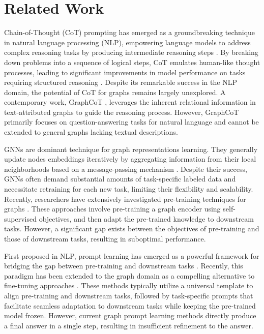\section{Related Work}
Chain-of-Thought (CoT) prompting has emerged as a groundbreaking technique in natural language processing (NLP), empowering language models to address complex reasoning tasks by producing intermediate reasoning steps \cite{wei2022chain,wang2023self,gao2023pal}. By breaking down problems into a sequence of logical steps, CoT emulates human-like thought processes, leading to significant improvements in model performance on tasks requiring structured reasoning \cite{yao2024tree,feng2024towards}. Despite its remarkable success in the NLP domain, the potential of CoT for graphs remains largely unexplored.  A contemporary work, GraphCoT \cite{jin2024graph}, leverages the inherent relational information in text-attributed graphs \cite{yan2023comprehensive,wen2023augmenting} to guide the reasoning process. However, GraphCoT primarily focuses on question-answering tasks for natural language and cannot be extended to general graphs lacking textual descriptions.

GNNs \cite{kipf2016semi, velivckovic2017graph} are dominant technique for graph representations learning. They generally update nodes embeddings iteratively by aggregating information from their local neighborhoods based on a message-passing mechanism \cite{xu2018powerful, hamilton2017inductive}. Despite their success, GNNs often demand substantial amounts of task-specific labeled data and necessitate retraining for each new task, limiting their flexibility and scalability.
Recently, researchers have extensively investigated pre-training techniques for graphs \cite{kipf2016variational, hu2020strategies, hu2020gpt, lu2021learning}. These approaches involve pre-training a graph encoder using self-supervised objectives, and then adapt the pre-trained knowledge to downstream tasks. However, a significant gap exists between the objectives of pre-training and those of downstream tasks, resulting in suboptimal performance. %


First proposed in NLP, prompt learning has emerged as a powerful framework for bridging the gap between pre-training and downstream tasks \cite{brown2020language,liu2021gpt,lester2021power}. Recently, this paradigm has been extended to the graph domain as a compelling alternative to fine-tuning approaches \cite{liu2023graphprompt,sun2022gppt,yu2023hgprompt,yu2024generalized}. These methods typically utilize a universal template to align pre-training and downstream tasks, followed by task-specific prompts that facilitate seamless adaptation to downstream tasks while keeping the pre-trained model frozen. However, current graph prompt learning methods directly produce a final answer in a single step, resulting in insufficient refinement to the answer.
